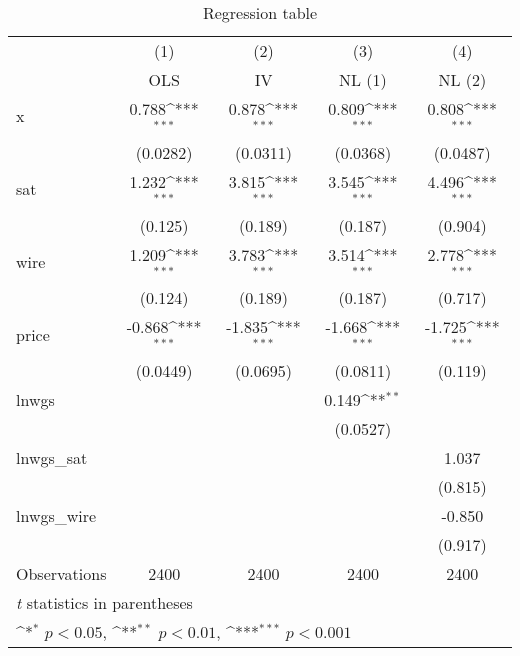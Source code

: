 \begin{table}[htbp]\centering
\def\sym#1{\ifmmode^{#1}\else\(^{#1}\)\fi}
\caption{Regression table\label{tab1}}
\begin{tabular}{l*{4}{c}}
\hline\hline
                    &\multicolumn{1}{c}{(1)}&\multicolumn{1}{c}{(2)}&\multicolumn{1}{c}{(3)}&\multicolumn{1}{c}{(4)}\\
                    &\multicolumn{1}{c}{OLS}&\multicolumn{1}{c}{IV}&\multicolumn{1}{c}{NL (1)}&\multicolumn{1}{c}{NL (2)}\\
\hline
x                   &       0.788\sym{***}&       0.878\sym{***}&       0.809\sym{***}&       0.808\sym{***}\\
&    (0.0282)         &    (0.0311)         &    (0.0368)         &    (0.0487)         \\
[1em]
sat                 &       1.232\sym{***}&       3.815\sym{***}&       3.545\sym{***}&       4.496\sym{***}\\
&     (0.125)         &     (0.189)         &     (0.187)         &     (0.904)         \\
[1em]
wire                &       1.209\sym{***}&       3.783\sym{***}&       3.514\sym{***}&       2.778\sym{***}\\
&     (0.124)         &     (0.189)         &     (0.187)         &     (0.717)         \\
[1em]
price               &      -0.868\sym{***}&      -1.835\sym{***}&      -1.668\sym{***}&      -1.725\sym{***}\\
&    (0.0449)         &    (0.0695)         &    (0.0811)         &     (0.119)         \\
[1em]
lnwgs               &                     &                     &       0.149\sym{**} &                     \\
&                     &                     &    (0.0527)         &                     \\
[1em]
lnwgs\_sat           &                     &                     &                     &       1.037         \\
&                     &                     &                     &     (0.815)         \\
[1em]
lnwgs\_wire          &                     &                     &                     &      -0.850         \\
&                     &                     &                     &     (0.917)         \\
\hline
Observations        &        2400         &        2400         &        2400         &        2400         \\
\hline\hline
\multicolumn{5}{l}{\footnotesize \textit{t} statistics in parentheses}\\
\multicolumn{5}{l}{\footnotesize \sym{*} \(p<0.05\), \sym{**} \(p<0.01\), \sym{***} \(p<0.001\)}\\
\end{tabular}
\end{table}
